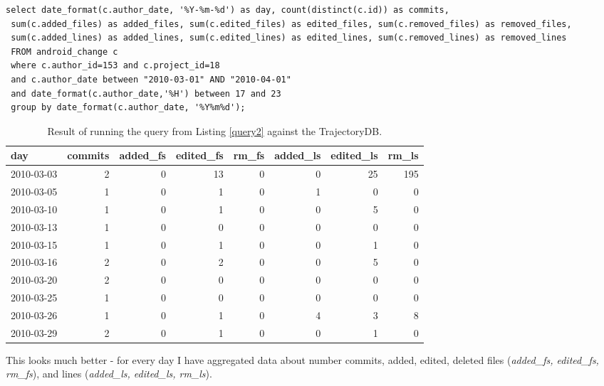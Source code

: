 \documentclass[a4paper,10pt]{article}
\numberwithin{equation}{subsection}
\begin{document}
\noindent\begin{minipage}{\textwidth}
\begin{lstlisting}[label=query2,caption=Data summary retrieval SQL query with aggergation by date]
select date_format(c.author_date, '%Y-%m-%d') as day, count(distinct(c.id)) as commits, 
 sum(c.added_files) as added_files, sum(c.edited_files) as edited_files, sum(c.removed_files) as removed_files, 
 sum(c.added_lines) as added_lines, sum(c.edited_lines) as edited_lines, sum(c.removed_lines) as removed_lines 
 FROM android_change c 
 where c.author_id=153 and c.project_id=18 
 and c.author_date between "2010-03-01" AND "2010-04-01"
 and date_format(c.author_date,'%H') between 17 and 23 
 group by date_format(c.author_date, '%Y%m%d');
\end{lstlisting}
\end{minipage}
\newpage
\begin{table}[hb]
\noindent\begin{minipage}{\textwidth}
  \caption{Result of running the query from Listing \ref{query2} against the TrajectoryDB.}
  \begin{tabularx}{\textwidth}{ | X | r | r | r | r | r | r | r | }
  \hline           
day & commits & added\_fs & edited\_fs & rm\_fs & added\_ls & edited\_ls & rm\_ls\\ 
\hline           
2010-03-03 & 2 & 0 & 13 & 0 & 0 & 25 & 195\\ 
2010-03-05 & 1 & 0 & 1 & 0 & 1 & 0 & 0\\ 
2010-03-10 & 1 & 0 & 1 & 0 & 0 & 5 & 0\\ 
2010-03-13 & 1 & 0 & 0 & 0 & 0 & 0 & 0\\ 
2010-03-15 & 1 & 0 & 1 & 0 & 0 & 1 & 0\\ 
2010-03-16 & 2 & 0 & 2 & 0 & 0 & 5 & 0\\ 
2010-03-20 & 2 & 0 & 0 & 0 & 0 & 0 & 0\\ 
2010-03-25 & 1 & 0 & 0 & 0 & 0 & 0 & 0\\ 
2010-03-26 & 1 & 0 & 1 & 0 & 4 & 3 & 8\\ 
2010-03-29 & 2 & 0 & 1 & 0 & 0 & 1 & 0\\
\hline    
  \end{tabularx}
\end{minipage}
  \label{tab:second}
\end{table}

This looks much better - for every day I have aggregated data about number commits, added, edited, deleted files (\emph{added\_fs, edited\_fs, rm\_fs}),
and lines (\emph{added\_ls, edited\_ls, rm\_ls}).
\end{document}
